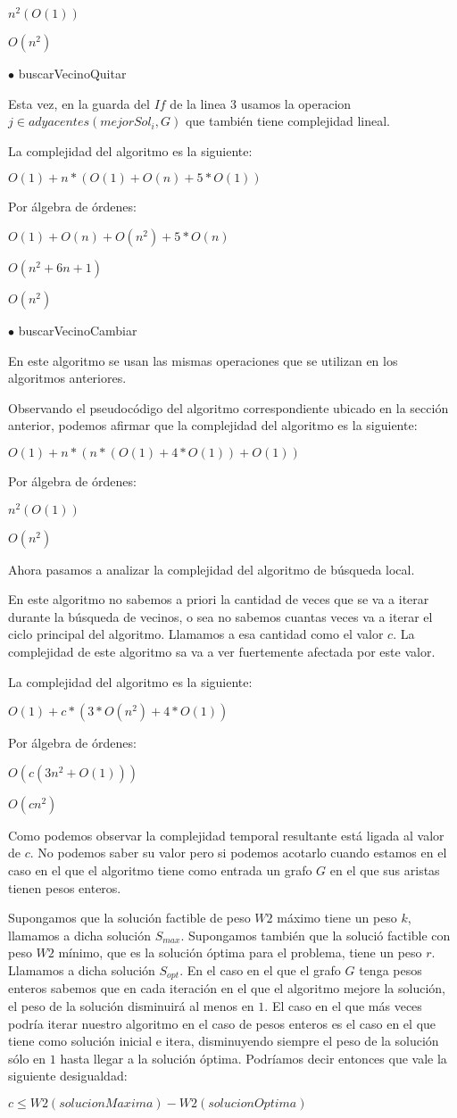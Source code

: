 $n^2(O(1))$

$O(n^2)$

$\bullet$ buscarVecinoQuitar

Esta vez, en la guarda del $If$ de la linea $3$ usamos la operacion $j \in adyacentes(mejorSol_i, G)$ que también tiene complejidad lineal.

La complejidad del algoritmo es la siguiente:

$O(1)+n*(O(1)+O(n)+5*O(1))$

Por álgebra de órdenes:

$O(1)+O(n)+O(n^2)+5*O(n)$

$O(n^2+6n+1)$

$O(n^2)$

$\bullet$ buscarVecinoCambiar

En este algoritmo se usan las mismas operaciones que se utilizan en los algoritmos anteriores.

Observando el pseudocódigo del algoritmo correspondiente ubicado en la sección anterior, podemos afirmar que la complejidad del algoritmo es la siguiente:

$O(1) + n*(n*(O(1) +4*O(1))+O(1))$

Por álgebra de órdenes:

$n^2(O(1))$

$O(n^2)$

Ahora pasamos a analizar la complejidad del algoritmo de búsqueda local.

En este algoritmo no sabemos a priori la cantidad de veces que se va a iterar durante la búsqueda de vecinos, o sea no sabemos cuantas veces va a iterar el ciclo principal del algoritmo. Llamamos a esa cantidad como el valor $c$. La complejidad de este algoritmo sa va a ver fuertemente afectada por este valor. 

La complejidad del algoritmo es la siguiente:

$O(1)+c*(3*O(n^2)+4*O(1))$

Por álgebra de órdenes:

$O(c(3n^2+O(1)))$

$O(cn^2)$

Como podemos observar la complejidad temporal resultante está ligada al valor de $c$. No podemos saber su valor pero si podemos acotarlo cuando estamos en el caso en el que el algoritmo tiene como entrada un grafo $G$ en el que sus aristas tienen pesos enteros.

Supongamos que la solución factible de peso $W2$ máximo tiene un peso $k$, llamamos a dicha solución $S_{max}$. Supongamos también que la solució factible con peso $W2$ mínimo, que es la solución óptima para el problema, tiene un peso $r$. Llamamos a dicha solución $S_{opt}$. En el caso en el que el grafo $G$ tenga pesos enteros sabemos que en cada iteración en el que el algoritmo mejore la solución, el peso de la solución disminuirá al menos en $1$. El caso en el que más veces podría iterar nuestro algoritmo en el caso de pesos enteros es el caso en el que tiene como solución inicial e itera, disminuyendo siempre el peso de la solución sólo en $1$ hasta llegar a la solución óptima. Podríamos decir entonces que vale la siguiente desigualdad:

$c \leq W2(solucionMaxima) - W2(solucionOptima)$  